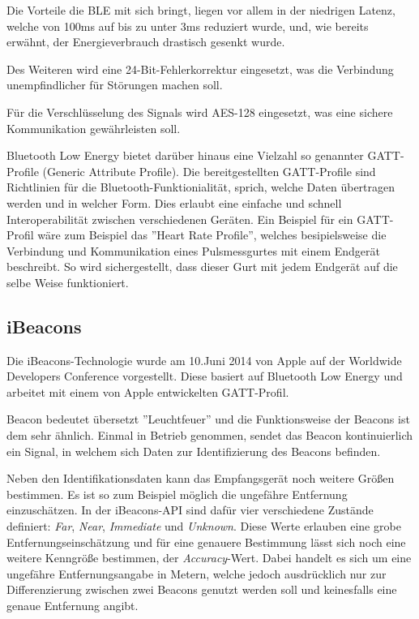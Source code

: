 Die Vorteile die BLE mit sich bringt, liegen vor allem in der niedrigen Latenz, welche von 100ms auf bis zu unter 3ms reduziert wurde, und, wie bereits erwähnt, der Energieverbrauch drastisch gesenkt wurde.

Des Weiteren wird eine 24-Bit-Fehlerkorrektur eingesetzt, was die Verbindung unempfindlicher für Störungen machen soll.

Für die Verschlüsselung des Signals wird AES-128 eingesetzt, was eine sichere Kommunikation gewährleisten soll.

Bluetooth Low Energy bietet darüber hinaus eine Vielzahl so genannter GATT-Profile (Generic Attribute Profile). Die bereitgestellten GATT-Profile sind Richtlinien für die Bluetooth-Funktionialität, sprich, welche Daten übertragen werden und in welcher Form. Dies erlaubt eine einfache und schnell Interoperabilität zwischen verschiedenen Geräten. Ein Beispiel für ein GATT-Profil wäre zum Beispiel das ''Heart Rate Profile'', welches besipielsweise die Verbindung und Kommunikation eines Pulsmessgurtes mit einem Endgerät beschreibt. So wird sichergestellt, dass dieser Gurt mit jedem Endgerät auf die selbe Weise funktioniert.




\subsection{iBeacons}
\label{sec:technologies:bluetoothLE:ibeacons}
Die iBeacons-Technologie wurde am 10.Juni 2014 von Apple auf der Worldwide Developers Conference vorgestellt. 
Diese basiert auf Bluetooth Low Energy und arbeitet mit einem von Apple entwickelten GATT-Profil.

Beacon bedeutet übersetzt ''Leuchtfeuer'' und die Funktionsweise der Beacons ist dem sehr ähnlich.
Einmal in Betrieb genommen, sendet das Beacon kontinuierlich ein Signal, in welchem sich Daten zur Identifizierung des Beacons befinden.

Neben den Identifikationsdaten kann das Empfangsgerät noch weitere Größen bestimmen. Es ist so zum Beispiel möglich die ungefähre Entfernung einzuschätzen. 
In der iBeacons-API sind dafür vier verschiedene Zustände definiert: \textit{Far}, \textit{Near}, \textit{Immediate} und \textit{Unknown}. Diese Werte erlauben eine grobe Entfernungseinschätzung und für eine genauere Bestimmung lässt sich noch eine weitere Kenngröße bestimmen, der \textit{Accuracy}-Wert. Dabei handelt es sich um eine ungefähre Entfernungsangabe in Metern, welche jedoch ausdrücklich nur zur Differenzierung zwischen zwei Beacons genutzt werden soll und keinesfalls eine genaue Entfernung angibt.

